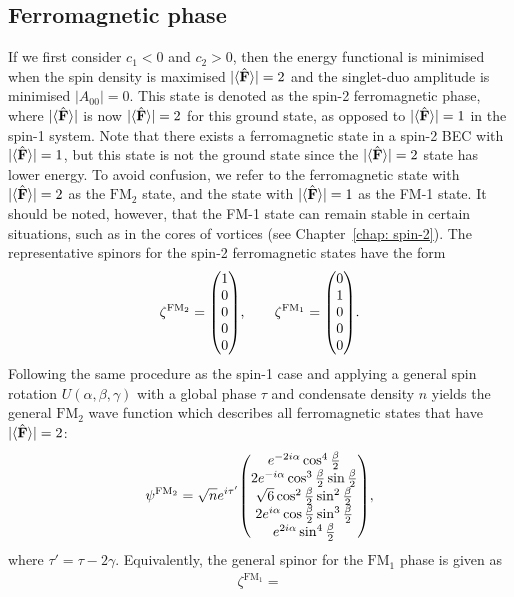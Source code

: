 \subsection{Ferromagnetic phase}
If we first consider \(c_1 < 0\) and \(c_2 > 0\), then the energy functional is
minimised when  the spin density is maximised \(|\langle \hat{\vb{F}} \rangle |=2\)
and the singlet-duo amplitude is minimised \(|A_{00}|=0\).
This state is denoted as the spin-2 ferromagnetic phase, where \(|\langle \hat{\vb{F}} \rangle | \) is
now \(|\langle \hat{\vb{F}} \rangle |=2\) for this ground state, as opposed to \(|\langle \hat{\vb{F}} \rangle |=1\) in the
spin-1 system.
Note that there exists a ferromagnetic state in a spin-2 BEC with
\(|\langle \hat{\vb{F}} \rangle |=1\), but this state is not the ground state since the \(|\langle \hat{\vb{F}} \rangle |=2\)
state has lower energy.
To avoid confusion, we refer to the ferromagnetic state with \(|\langle \hat{\vb{F}} \rangle |=2\) as
the \(\text{FM}_2\) state, and the state with \(|\langle \hat{\vb{F}} \rangle |=1\) as the FM-1 state.
It should be noted, however, that the FM-1 state can remain stable in
certain situations, such as in the cores of vortices (see
Chapter~\ref{chap: spin-2}).
The representative spinors for the spin-2 ferromagnetic states have the form
\begin{equation}\label{eq: FM2-FM1-spinors}
    \zeta^{\text{FM}_2} = \mqty(1 \\ 0 \\ 0 \\ 0 \\ 0), \qquad
    \zeta^{\text{FM}_1} = \mqty(0 \\ 1 \\ 0 \\ 0 \\ 0).
\end{equation}
Following the same procedure as the spin-1 case and applying a general spin
rotation \(U(\alpha, \beta, \gamma)\) with a global phase \(\tau \) and
condensate density \(n\) yields the general \(\text{FM}_2\) wave function which describes
all ferromagnetic states that have \(|\langle \hat{\vb{F}} \rangle |=2\):
\begin{equation}\label{eq: FM-2-representative-spinor}
    \psi^{\text{FM}_2} = \sqrt{n}e^{i\tau'}\mqty(
    e^{-2i\alpha} \cos^4\frac{\beta}{2} \\
    2e^{-i\alpha}\cos^3\frac{\beta}{2}\sin \frac{\beta}{2} \\
    \sqrt{6} \cos^2\frac{\beta}{2} \sin^2\frac{\beta}{2} \\
    2e^{i\alpha}\cos\frac{\beta}{2} \sin^3\frac{\beta}{2} \\
    e^{2i\alpha} \sin^4\frac{\beta}{2}
    ),
\end{equation}
where \(\tau'=\tau-2\gamma \).
Equivalently, the general spinor for the \(\text{FM}_1\) phase is given as
\begin{align}
    \zeta^{\text{FM}_1} = 
\end{align}

